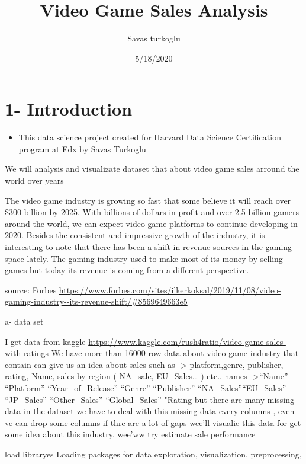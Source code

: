 \documentclass[]{article}
\title{Video Game Sales Analysis}
\author{Savas turkoglu}
\date{5/18/2020}
\providecommand{\tightlist}{%
  \setlength{\itemsep}{0pt}\setlength{\parskip}{0pt}}
\begin{document}
\maketitle

\hypertarget{introduction}{%
\section{1- Introduction}\label{introduction}}

\begin{itemize}
\tightlist
\item
  This data science project created for Harvard Data Science
  Certification program at Edx by Savas Turkoglu
\end{itemize}

We will analysis and visualizate dataset that about video game sales
arround the world over years

The video game industry is growing so fast that some believe it will
reach over \$300 billion by 2025. With billions of dollars in profit and
over 2.5 billion gamers around the world, we can expect video game
platforms to continue developing in 2020. Besides the consistent and
impressive growth of the industry, it is interesting to note that there
has been a shift in revenue sources in the gaming space lately. The
gaming industry used to make most of its money by selling games but
today its revenue is coming from a different perspective.

source: Forbes
\url{https://www.forbes.com/sites/ilkerkoksal/2019/11/08/video-gaming-industry--its-revenue-shift/\#8569649663e5}

a- data set

I get data from kaggle
\url{https://www.kaggle.com/rush4ratio/video-game-sales-with-ratings} We
have more than 16000 row data about video game industry that contain can
give us an idea about sales such as -\textgreater{} platform,genre,
publisher, rating, Name, sales by region ( NA\_sale, EU\_Sales\ldots{} )
etc.. names -\textgreater{}``Name'' ``Platform'' ``Year\_of\_Release''
``Genre'' ``Publisher'' ``NA\_Sales''``EU\_Sales'' ``JP\_Sales''
``Other\_Sales'' ``Global\_Sales'' "Rating but there are many missing
data in the dataset we have to deal with this missing data every columns
, even ve can drop some columns if thre are a lot of gaps wee'll
visualie this data for get some idea about this industry. wee'ww try
estimate sale performance

load libraryes Loading packages for data exploration, visualization,
preprocessing,
\end{document}
